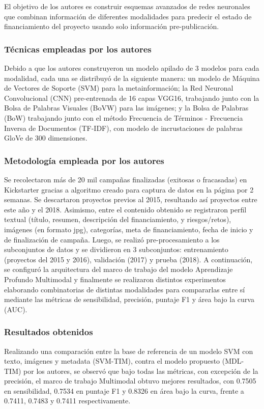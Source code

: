 El objetivo de los autores es construir esquemas avanzados de redes neuronales que combinan información de diferentes modalidades para predecir el estado de financiamiento del proyecto usando solo información pre-publicación.

\subsubsection{Técnicas empleadas por los autores}
Debido a que los autores construyeron un modelo apilado de 3 modelos para cada modalidad, cada una se distribuyó de la siguiente manera: un modelo de Máquina de Vectores de Soporte (SVM) para la metainformación; la Red Neuronal Convolucional (CNN) pre-entrenada de 16 capas VGG16, trabajando junto con la Bolsa de Palabras Visuales (BoVW) para las imágenes; y la Bolsa de Palabras (BoW) trabajando junto con el método Frecuencia de Términos - Frecuencia Inversa de Documentos (TF-IDF), con modelo de incrustaciones de palabras GloVe de 300 dimensiones.

\subsubsection{Metodología empleada por los autores}
Se recolectaron más de 20 mil campañas finalizadas (exitosas o fracasadas) en Kickstarter gracias a algoritmo creado para captura de datos en la página por 2 semanas. Se descartaron proyectos previos al 2015, resultando así proyectos entre este año y el 2018. Asimismo, entre el contenido obtenido se registraron perfil textual (título, resumen, descripción del financiamiento, y riesgos/retos), imágenes (en formato jpg), categorías, meta de financiamiento, fecha de inicio y de finalización de campaña. Luego, se realizó pre-procesamiento a los subconjuntos de datos y se dividieron en 3 subconjuntos: entrenamiento (proyectos del 2015 y 2016), validación (2017) y prueba (2018). A continuación, se configuró la arquitectura del marco de trabajo del modelo Aprendizaje Profundo Multimodal y finalmente se realizaron distintos experimentos elaborando combinatorias de distintas modalidades para compararlas entre sí mediante las métricas de sensibilidad, precisión, puntaje F1 y área bajo la curva (AUC).

\subsubsection{Resultados obtenidos}
Realizando una comparación entre la base de referencia de un modelo SVM con texto, imágenes y metadata (SVM-TIM), contra el modelo propuesto (MDL-TIM) por los autores, se observó que bajo todas las métricas, con excepción de la precisión, el marco de trabajo Multimodal obtuvo mejores resultados, con 0.7505 en sensibilidad, 0.7534 en puntaje F1 y 0.8326 en área bajo la curva, frente a 0.7411, 0.7483 y 0.7411 respectivamente.

